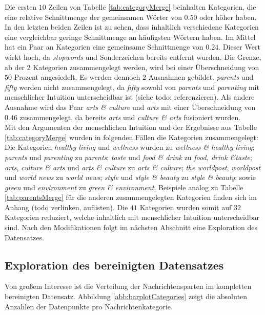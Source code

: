 \documentclass[a4paper,11pt]{article}
\begin{document}
Die ersten $10$ Zeilen von Tabelle \ref{tab:categoryMerge} beinhalten Kategorien, die eine relative Schnittmenge der gemeinsamen Wörter von $0.50$ oder höher haben. In den letzten beiden Zeilen ist zu sehen, dass inhaltlich verschiedene Kategorien eine vergleichbar geringe Schnittmenge an häufigsten Wörtern haben. Im Mittel hat ein Paar an Kategorien eine gemeinsame Schnittmenge von $0.24$. Dieser Wert wirkt hoch, da \textit{stopwords} und Sonderzeichen bereits entfernt wurden.
Die Grenze, ab der $2$ Kategorien zusammengelegt werden, wird bei einer Überschneidung von $50$ Prozent angesiedelt. Es werden dennoch $2$ Ausnahmen gebildet. \textit{parents} und \textit{fifty} werden nicht zusammengelegt, da \textit{fifty} sowohl von \textit{parents} und \textit{parenting} mit menschlicher Intuition unterscheidbar ist (siehe todo: referenzieren). Als andere Ausnahme wird das Paar \textit{arts \& culture} und \textit{arts} mit einer Überschneidung von $0.46$ zusammengelegt, da bereits \textit{arts} und \textit{culture \& arts} fusioniert wurden.\\
Mit den Argumenten der menschlichen Intuition und der Ergebnisse aus Tabelle \ref{tab:categoryMerge} wurden in folgenden Fällen die Kategorien zusammengelegt:
Die Kategorien \textit{healthy living} und \textit{wellness} wurden zu \textit{wellness \& healthy living}; \textit{parents} und \textit{parenting}  zu \textit{parents}; \textit{taste} und \textit{food \& drink} zu \textit{food, drink \&taste}; \textit{arts}, \textit{culture \& arts} und \textit{arts \& culture} zu \textit{arts \& culture}; \textit{the worldpost}, \textit{worldpost} und \textit{world news} zu \textit{world news}; \textit{style} und \textit{style \& beauty} zu \textit{style \& beauty};  sowie \textit{green} und \textit{environment} zu \textit{green \& environment}. Beispiele analog zu Tabelle \ref{tab:parentsMerge} für die anderen zusammengelegten Kategorien finden sich im Anhang (todo verlinken, auflisten). Die $41$ Kategorien wurden somit auf $32$ Kategorien reduziert, welche inhaltlich mit menschlicher Intuition unterscheidbar sind. Nach den Modifikationen folgt im nächsten Abschnitt eine Exploration des Datensatzes.

\subsection{Exploration des bereinigten Datensatzes}

Von großem Interesse ist die Verteilung der Nachrichtensparten im kompletten bereinigten Datensatz.
Abbildung \ref{abb:barplotCategories} zeigt die absoluten Anzahlen der Datenpunkte pro Nachrichtenkategorie. 
\end{document}
